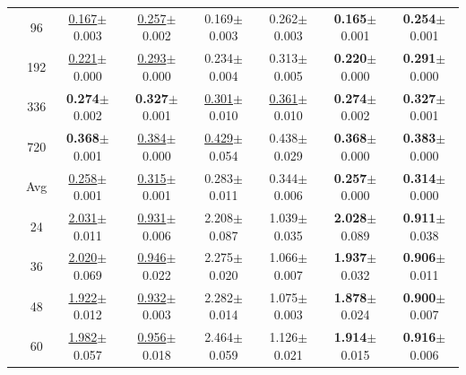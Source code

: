\begin{table}[t]
{\begin{tabular}{c|c|cc|cc|cc}
\midrule
{} & 96 & \underline{0.167}{\scriptsize$\pm$0.003} & \underline{0.257}{\scriptsize$\pm$0.002} & 0.169{\scriptsize$\pm$0.003} & 0.262{\scriptsize$\pm$0.003} & \textbf{0.165}{\scriptsize$\pm$0.001} & \textbf{0.254}{\scriptsize$\pm$0.001} \\
 & 192 & \underline{0.221}{\scriptsize$\pm$0.000} & \underline{0.293}{\scriptsize$\pm$0.000} & 0.234{\scriptsize$\pm$0.004} & 0.313{\scriptsize$\pm$0.005} & \textbf{0.220}{\scriptsize$\pm$0.000} & \textbf{0.291}{\scriptsize$\pm$0.000} \\
 & 336 & \textbf{0.274}{\scriptsize$\pm$0.002} & \textbf{0.327}{\scriptsize$\pm$0.001} & \underline{0.301}{\scriptsize$\pm$0.010} & \underline{0.361}{\scriptsize$\pm$0.010} & \textbf{0.274}{\scriptsize$\pm$0.002} & \textbf{0.327}{\scriptsize$\pm$0.001} \\
 & 720 & \textbf{0.368}{\scriptsize$\pm$0.001} & \underline{0.384}{\scriptsize$\pm$0.000} & \underline{0.429}{\scriptsize$\pm$0.054} & 0.438{\scriptsize$\pm$0.029} & \textbf{0.368}{\scriptsize$\pm$0.000} & \textbf{0.383}{\scriptsize$\pm$0.000} \\
\cmidrule(lr){2-8}
 & Avg & \underline{0.258}{\scriptsize$\pm$0.001} & \underline{0.315}{\scriptsize$\pm$0.001} & 0.283{\scriptsize$\pm$0.011} & 0.344{\scriptsize$\pm$0.006} & \textbf{0.257}{\scriptsize$\pm$0.000} & \textbf{0.314}{\scriptsize$\pm$0.000} \\
\midrule
{} & 24 & \underline{2.031}{\scriptsize$\pm$0.011} & \underline{0.931}{\scriptsize$\pm$0.006} & 2.208{\scriptsize$\pm$0.087} & 1.039{\scriptsize$\pm$0.035} & \textbf{2.028}{\scriptsize$\pm$0.089} & \textbf{0.911}{\scriptsize$\pm$0.038} \\
 & 36 & \underline{2.020}{\scriptsize$\pm$0.069} & \underline{0.946}{\scriptsize$\pm$0.022} & 2.275{\scriptsize$\pm$0.020} & 1.066{\scriptsize$\pm$0.007} & \textbf{1.937}{\scriptsize$\pm$0.032} & \textbf{0.906}{\scriptsize$\pm$0.011} \\
 & 48 & \underline{1.922}{\scriptsize$\pm$0.012} & \underline{0.932}{\scriptsize$\pm$0.003} & 2.282{\scriptsize$\pm$0.014} & 1.075{\scriptsize$\pm$0.003} & \textbf{1.878}{\scriptsize$\pm$0.024} & \textbf{0.900}{\scriptsize$\pm$0.007} \\
 & 60 & \underline{1.982}{\scriptsize$\pm$0.057} & \underline{0.956}{\scriptsize$\pm$0.018} & 2.464{\scriptsize$\pm$0.059} & 1.126{\scriptsize$\pm$0.021} & \textbf{1.914}{\scriptsize$\pm$0.015} & \textbf{0.916}{\scriptsize$\pm$0.006} \\

\end{tabular}}
\end{table}
